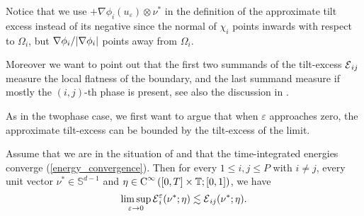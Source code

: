 Notice that we use $ + \nabla \phi_{ i } ( u_{ \varepsilon } ) \otimes \nu^{ 
	\ast } $ in the definition of the approximate tilt excess instead of its 
negative since the normal of $ \chi_{ i } $ points inwards with respect to $ 
\Omega_{ i } $, but $ \nabla \phi_{ i } / \abs{ \nabla \phi_{ i } } $ points 
away from $ \Omega_{ i } $.

Moreover we want to point out that the first two summands of the tilt-excess $ 
\tilt_excess_{ i j } $ measure the local flatness of the boundary, and the 
last summand measure if mostly the $(i,j)$-th phase is present, see also the 
discussion in .

As in the twophase case, we first want to argue that when $ \varepsilon $ 
approaches zero, the approximate tilt-excess can be bounded by the tilt-excess 
of the limit.

\begin{lemma}
	\label{approximate_tilt_excess_estimated_in_limit_by_tilt_excess}
	Assume that we are in the situation of 
	 and that the time-integrated 
	energies converge (\ref{energy_convergence}). Then for every $ 1 \leq i , j 
	\leq P $ with $ i \neq j $, every unit vector $ \nu^{ \ast } \in \mathbb{ S 
	}^{ d - 1 } $ and 
	$ \eta \in \operatorname{C}^{ \infty } \left( [ 0 , T ] \times \operatorname{\mathbb{T}} ; [ 0 ,1 ] 
	\right) $, we have
	\begin{equation*}
		\limsup_{ \varepsilon \to 0 }
		\tilt_excess_{ i }^{ \varepsilon } ( \nu^{ \ast } ; \eta  ) 
		\lesssim
		\tilt_excess_{ i j } ( \nu^{ \ast } ; \eta ).
	\end{equation*}
\end{lemma}

